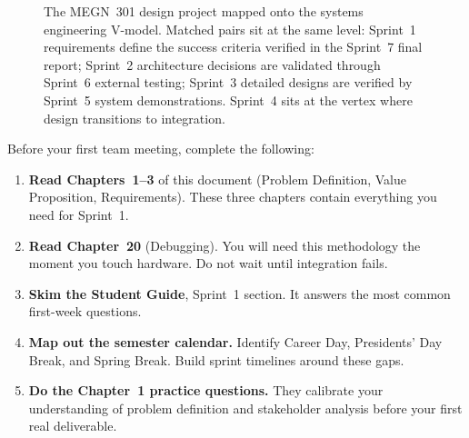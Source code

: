 \begin{figure}[htbp]
{%
}%
\caption{The MEGN~301 design project mapped onto the systems engineering V-model. Matched pairs sit at the same level: Sprint~1 requirements define the success criteria verified in the Sprint~7 final report; Sprint~2 architecture decisions are validated through Sprint~6 external testing; Sprint~3 detailed designs are verified by Sprint~5 system demonstrations. Sprint~4 sits at the vertex where design transitions to integration.}\label{fig:vmodel_mrd}
\end{figure}


\begin{checklistbox}
Before your first team meeting, complete the following:
\begin{enumerate}[nosep,leftmargin=1.5em]
\item \textbf{Read Chapters~1--3} of this document (Problem Definition, Value Proposition, Requirements). These three chapters contain everything you need for Sprint~1.
\item \textbf{Read Chapter~20} (Debugging). You will need this methodology the moment you touch hardware. Do not wait until integration fails.
\item \textbf{Skim the Student Guide}, Sprint~1 section. It answers the most common first-week questions.
\item \textbf{Map out the semester calendar.} Identify Career Day, Presidents' Day Break, and Spring Break. Build sprint timelines around these gaps.
\item \textbf{Do the Chapter~1 practice questions.} They calibrate your understanding of problem definition and stakeholder analysis before your first real deliverable.
\end{enumerate}
\end{checklistbox}


